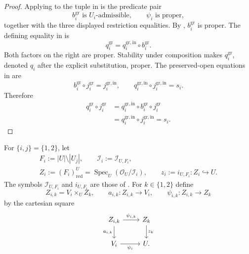 \begin{proof}
  Applying  to the tuple in
   is the predicate pair
  \[
    b_i^{\mathrm{gr}}\text{ is }U_i\text{-admissible},\qquad
    \psi_i\text{ is proper},
  \]
  together with the three displayed restriction equalities.  By
  , $b_i^{\mathrm{gr}}$ is proper.  The
  defining equality in  is
  \[
    q_i^{\mathrm{gr}}=q_i^{\mathrm{gr,in}}\circ b_i^{\mathrm{gr}}.
  \]
  Both factors on the right are proper.  Stability under composition makes
  $q_i^{\mathrm{gr}}$, denoted $q_i$ after the explicit substitution, proper.
  The preserved-open equations in
   are
  \[
    b_i^{\mathrm{gr}}\circ j_i^{\mathrm{gr}}=j_i^{\mathrm{gr,in}},
    \qquad
    q_i^{\mathrm{gr,in}}\circ j_i^{\mathrm{gr,in}}=s_i.
  \]
  Therefore
  \[
  \begin{aligned}
    q_i^{\mathrm{gr}}\circ j_i^{\mathrm{gr}}
      &=q_i^{\mathrm{gr,in}}\circ b_i^{\mathrm{gr}}
          \circ j_i^{\mathrm{gr}}\\
      &=q_i^{\mathrm{gr,in}}\circ j_i^{\mathrm{gr,in}}
       =s_i.
  \end{aligned}
  \]
\end{proof}

\begin{definition}
  \label{def:nagata-two-open-boundary-loci}
  \lean{}

  For $\{i,j\}=\{1,2\}$, let
  \[
  \begin{gathered}
    F_i:=|U|\setminus|U_j|,\qquad
    \mathcal I_i:=\mathcal I_{U,F_i},\\
    Z_i:=(F_i)_{\mathrm{red}}^U
      =\operatorname{Spec}_U(\mathcal O_U/\mathcal I_i),
    \qquad
    z_i:=i_{U,F_i}\colon Z_i\hookrightarrow U.
  \end{gathered}
  \]
  The symbols $\mathcal I_{U,F_i}$ and $i_{U,F_i}$ are those of
  .  For $k\in\{1,2\}$ define
  \[
    Z_{i,k}=V_i\times_UZ_k,\qquad
    a_{i,k}\colon Z_{i,k}\to V_i,\qquad
    \psi_{i,k}\colon Z_{i,k}\to Z_k
  \]
  by the cartesian square
  \[
    \begin{tikzcd}
      Z_{i,k} \arrow[r,"\psi_{i,k}"] \arrow[d,"a_{i,k}"']
        & Z_k \arrow[d,"z_k"]\\
      V_i \arrow[r,"\psi_i"'] & U.
    \end{tikzcd}
  \]
\end{definition}

